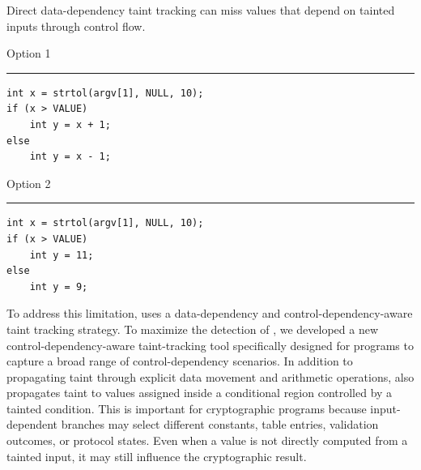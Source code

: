\begin{ZZlisting}[H]
\caption{Direct data-dependency taint tracking can miss values that depend on tainted inputs through control flow.}
\vspace*{10pt}
\centering
\begin{adjustbox}{max width=\textwidth}
\begin{CenteredBox}
\begin{minipage}{0.96\textwidth}

\begin{minipage}[t]{0.47\textwidth}
Option 1

\vspace{0.3em}
\hrule
\vspace{0.5em}

\begin{lstlisting}[style=cstyle]
int x = strtol(argv[1], NULL, 10);
if (x > VALUE)
    int y = x + 1;
else
    int y = x - 1;
\end{lstlisting}
\end{minipage}
\hfill
\begin{minipage}[t]{0.47\textwidth}
Option 2

\vspace{0.3em}
\hrule
\vspace{0.5em}

\begin{lstlisting}[style=cstyle]
int x = strtol(argv[1], NULL, 10);
if (x > VALUE)
    int y = 11;
else
    int y = 9;
\end{lstlisting}
\end{minipage}

\end{minipage}
\end{CenteredBox}
\end{adjustbox}
\label{list:taintdiff}
\end{ZZlisting}


To address this limitation, \greyboxfuzz uses a data-dependency and control-dependency-aware taint tracking strategy. To maximize the detection of \cryptobranch, we developed a new control-dependency-aware taint-tracking tool specifically designed for \zksnark programs to capture a broad range of control-dependency scenarios. 
In addition to propagating taint through explicit data movement and arithmetic operations, \greyboxfuzz also propagates taint to values assigned inside a conditional region controlled by a tainted condition. This is important for cryptographic programs because input-dependent branches may select different constants, table entries, validation outcomes, or protocol states. Even when a value is not directly computed from a tainted input, it may still influence the cryptographic result.

